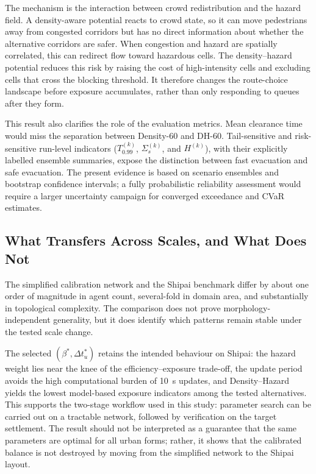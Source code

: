\documentclass[preprint,12pt]{elsarticle}
\providecommand{\FloatBarrier}{}
\let\origsubsection\subsection
\renewcommand{\subsection}{\FloatBarrier\origsubsection}
\begin{document}
The mechanism is the interaction between crowd redistribution and the
hazard field. A density-aware potential reacts to crowd state, so it can
move pedestrians away from congested corridors but has no direct
information about whether the alternative corridors are safer. When
congestion and hazard are spatially correlated, this can redirect flow
toward hazardous cells. The density--hazard potential reduces this risk
by raising the cost of high-intensity cells and excluding cells that
cross the blocking threshold. It therefore changes the route-choice
landscape before exposure accumulates, rather than only responding to
queues after they form.

This result also clarifies the role of the evaluation metrics. Mean
clearance time would miss the separation between Density-60 and DH-60.
Tail-sensitive and risk-sensitive run-level indicators
($T_{0.99}^{(k)}$, $\Sigma_s^{(k)}$, and $H^{(k)}$),
with their explicitly labelled ensemble summaries, expose the distinction between fast evacuation and
safe evacuation. The present evidence is based on scenario ensembles and
bootstrap confidence intervals; a fully probabilistic reliability
assessment would require a larger uncertainty campaign for converged
exceedance and CVaR estimates.

\subsection{What Transfers Across Scales, and What Does Not}
\label{sec:disc_transfer}

The simplified calibration network and the Shipai benchmark differ by
about one order of magnitude in agent count, several-fold in domain
area, and substantially in topological complexity. The comparison does
not prove morphology-independent generality, but it does identify which
patterns remain stable under the tested scale change.

The selected $(\beta^{*}, \Delta t_u^{*})$ retains the intended
behaviour on Shipai: the hazard weight lies near the knee of the
efficiency--exposure trade-off, the update period avoids the high
computational burden of \SI{10}{s} updates, and Density--Hazard yields the
lowest model-based exposure indicators among the tested alternatives. This supports the
two-stage workflow used in this study: parameter search can be carried
out on a tractable network, followed by verification on the target
settlement. The result should not be interpreted as a guarantee that the
same parameters are optimal for all urban forms; rather, it shows that
the calibrated balance is not destroyed by moving from the simplified
network to the Shipai layout.
\end{document}

